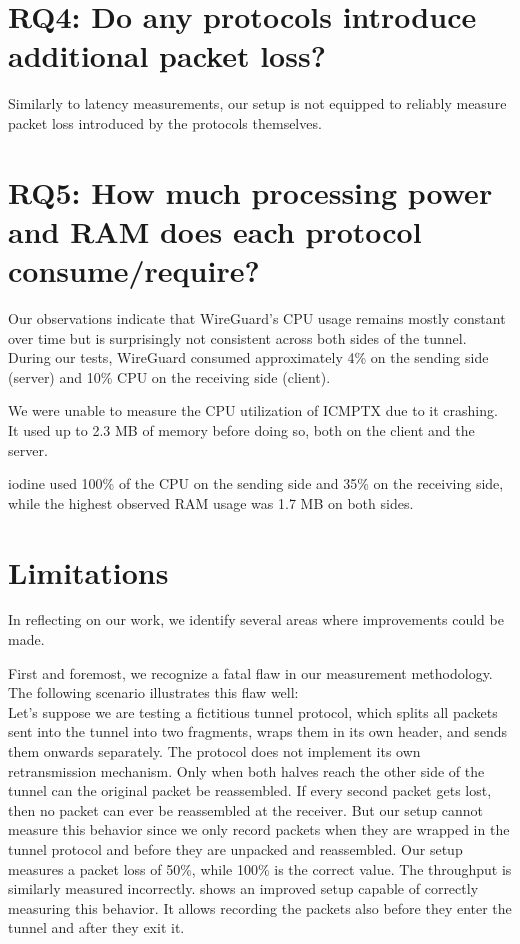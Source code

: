 \section{RQ4: Do any protocols introduce additional packet loss?}
Similarly to latency measurements, our setup is not equipped to reliably measure packet loss introduced by the protocols themselves.


\section{RQ5: How much processing power and RAM does each protocol consume/require?}
Our observations indicate that WireGuard's CPU usage remains mostly constant over time but is surprisingly not consistent across both sides of the tunnel.
During our tests, WireGuard consumed approximately 4\% on the sending side (server) and 10\% CPU on the receiving side (client).

We were unable to measure the CPU utilization of ICMPTX due to it crashing.
It used up to 2.3 MB of memory before doing so, both on the client and the server.

iodine used 100\% of the CPU on the sending side and 35\% on the receiving side, while the highest observed RAM usage was 1.7 MB on both sides.


\section{Limitations}
In reflecting on our work, we identify several areas where improvements could be made.

First and foremost, we recognize a fatal flaw in our measurement methodology.
The following scenario illustrates this flaw well:\\
Let's suppose we are testing a fictitious tunnel protocol, which splits all packets sent into the tunnel into two fragments, wraps them in its own header, and sends them onwards separately.
The protocol does not implement its own retransmission mechanism.
Only when both halves reach the other side of the tunnel can the original packet be reassembled.
If every second packet gets lost, then no packet can ever be reassembled at the receiver.
But our setup cannot measure this behavior since we only record packets when they are wrapped in the tunnel protocol and before they are unpacked and reassembled.
Our setup measures a packet loss of 50\%, while 100\% is the correct value.
The throughput is similarly measured incorrectly.
 shows an improved setup capable of correctly measuring this behavior.
It allows recording the packets also before they enter the tunnel and after they exit it.

